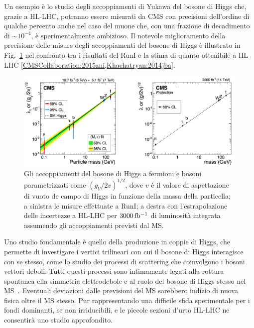 Un esempio \`e lo studio degli accoppiamenti di Yukawa del bosone di Higgs che, grazie a HL-LHC, potranno essere misurati da CMS con precisioni dell'ordine di qualche percento anche nel caso del muone che, con una frazione di decadimento di $\sim 10^{-4}$, \`e sperimentalmente ambizioso.
Il notevole miglioramento della precisione delle misure degli accoppiamenti del bosone di Higgs \`e illustrato in Fig.~\ref{HLLHCCouplings} nel confronto tra i risultati del RunI e la stima di quanto ottenibile a HL-LHC \ref{CMSCollaboration:2015zni,Khachatryan:2014jba}.
\begin{figure}
\centering
\includegraphics[width=\textwidth]{Immagini/HLLHC_Couplings.png}
\caption{Gli accoppiamenti del bosone di Higgs a fermioni e bosoni parametrizzati come $(g_V/2v)^{1/2}$, dove $v$ \`e il valore di aspettazione di vuoto de campo di Higgs in funzione della massa della particella; a sinistra le misure effettuate a RunI; a destra con l'estrapolazione delle incertezze a HL-LHC per $3000{\rm \, fb^{-1}}$ di luminosit\`a integrata assumendo gli accoppiamenti previsti dal MS.}
\label{HLLHCCouplings}
\end{figure}

Uno studio fondamentale \`e quello della produzione in coppie di Higgs, che permette di investigare i vertici trilineari con cui il bosone di Higgs interagisce con se stesso, come lo studio dei processi di scattering che coinvolgono i bosoni vettori deboli. Tutti questi processi sono intimamente legati alla rottura spontanea ella simmetria elettrodebole e al ruolo del bosone di Higgs stesso nel MS~\cite{CMSCollaboration:2015zni}. Eventuali deviazioni dalle previsioni del MS sarebbero indizio di nuova fisica oltre il MS stesso. Pur rappresentando una difficile sfida sperimentale per i fondi dominanti, se non irriducibili, e le piccole sezioni d'urto HL-LHC ne consentir\`a uno studio approfondito.

